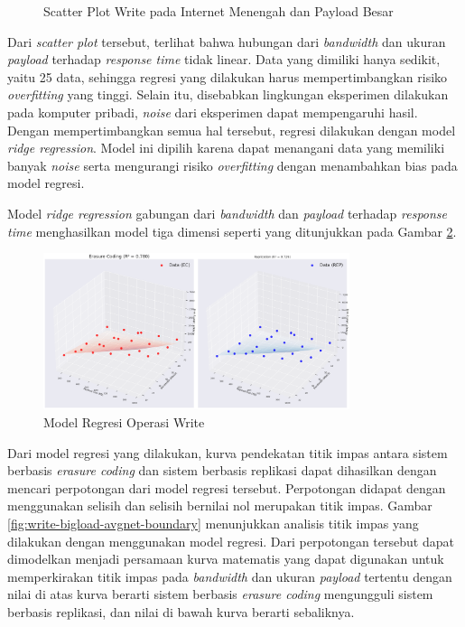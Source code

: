 \begin{enumerate}
\begin{figure}[ht]
    \caption{Scatter Plot Write pada Internet Menengah dan Payload Besar}
    \label{fig:write-bigload-avgnet-scatter}
  \end{figure}

  Dari \textit{scatter plot} tersebut, terlihat bahwa hubungan dari \textit{bandwidth} dan ukuran \textit{payload} terhadap \textit{response time} tidak linear. Data yang dimiliki hanya sedikit, yaitu 25 data, sehingga regresi yang dilakukan harus mempertimbangkan risiko \textit{overfitting} yang tinggi. Selain itu, disebabkan lingkungan eksperimen dilakukan pada komputer pribadi, \textit{noise} dari eksperimen dapat mempengaruhi hasil. Dengan mempertimbangkan semua hal tersebut, regresi dilakukan dengan model \textit{ridge regression}. Model ini dipilih karena dapat menangani data yang memiliki banyak \textit{noise} serta mengurangi risiko \textit{overfitting} dengan menambahkan bias pada model regresi.

  Model \textit{ridge regression} gabungan dari \textit{bandwidth} dan \textit{payload} terhadap \textit{response time} menghasilkan model tiga dimensi seperti yang ditunjukkan pada Gambar \ref{fig:write-bigload-avgnet-regression}.

  \begin{figure}[ht]
    \centering
    \includegraphics[width=0.8\textwidth]{resources/chapter-4/write_bigload_avgnet_regression.png}

    \caption{Model Regresi Operasi Write}
    \label{fig:write-bigload-avgnet-regression}
  \end{figure}

  Dari model regresi yang dilakukan, kurva pendekatan titik impas antara sistem berbasis \textit{erasure coding} dan sistem berbasis replikasi dapat dihasilkan dengan mencari perpotongan dari model regresi tersebut. Perpotongan didapat dengan menggunakan selisih dan selisih bernilai nol merupakan titik impas. Gambar \ref{fig:write-bigload-avgnet-boundary} menunjukkan analisis titik impas yang dilakukan dengan menggunakan model regresi. Dari perpotongan tersebut dapat dimodelkan menjadi persamaan kurva matematis yang dapat digunakan untuk memperkirakan titik impas pada \textit{bandwidth} dan ukuran \textit{payload} tertentu dengan nilai di atas kurva berarti sistem berbasis \textit{erasure coding} mengungguli sistem berbasis replikasi, dan nilai di bawah kurva berarti sebaliknya.



\end{enumerate}
